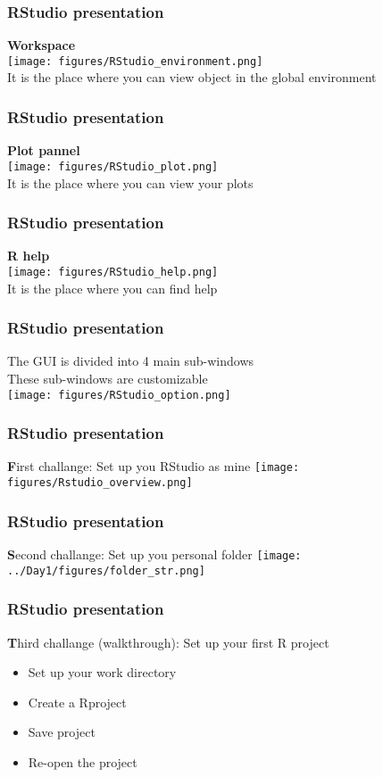 \documentclass{beamer}
\begin{document}
\begin{frame}
	\frametitle{RStudio presentation}
	\textbf{Workspace}\\
	\vspace{16pt}
	\centering \texttt{[image: figures/RStudio\_environment.png]}\\
	\small It is the place where you can view object in the global environment
\end{frame}

\begin{frame}
	\frametitle{RStudio presentation}
	\textbf{Plot pannel}\\
	\vspace{20pt}
	\centering \texttt{[image: figures/RStudio\_plot.png]}\\
	\small It is the place where you can view your plots
\end{frame}

\begin{frame}
	\frametitle{RStudio presentation}
	\textbf{R help}\\
	\vspace{20pt}
	\centering \texttt{[image: figures/RStudio\_help.png]}\\
	\small It is the place where you can find help
\end{frame}

\begin{frame}
	\frametitle{RStudio presentation}
	The GUI is divided into 4 main sub-windows\\
	These sub-windows are customizable\\
	\vspace{10pt}
	\centering \texttt{[image: figures/RStudio\_option.png]}
\end{frame}

\begin{frame}
	\frametitle{RStudio presentation}
	{\textbf First challange}: Set up you RStudio as mine
	\centering \texttt{[image: figures/Rstudio\_overview.png]}
\end{frame}

\begin{frame}
	\frametitle{RStudio presentation}
	{\textbf Second challange}: Set up you personal folder
	\centering \texttt{[image: ../Day1/figures/folder\_str.png]}
\end{frame}

\begin{frame}
	\frametitle{RStudio presentation}
	{\textbf Third challange} (walkthrough): Set up your first R project
	\begin{itemize}
		\item Set up your work directory
		\item Create a Rproject
		\item Save project
		\item Re-open the project
	\end{itemize}
\end{frame}
\end{document}
